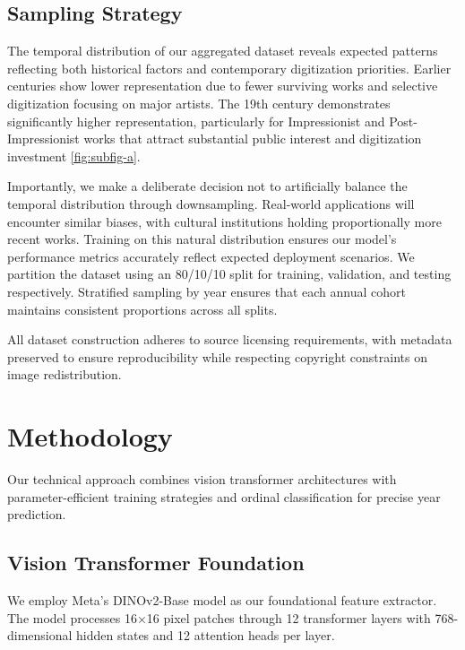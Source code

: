 \documentclass[10pt,twocolumn,letterpaper]{article}
\begin{document}
\subsection{Sampling Strategy}

The temporal distribution of our aggregated dataset reveals expected patterns reflecting both historical factors and contemporary digitization priorities. Earlier centuries show lower representation due to fewer surviving works and selective digitization focusing on major artists. The 19th century demonstrates significantly higher representation, particularly for Impressionist and Post-Impressionist works that attract substantial public interest and digitization investment \ref{fig:subfig-a}.

Importantly, we make a deliberate decision not to artificially balance the temporal distribution through downsampling. Real-world applications will encounter similar biases, with cultural institutions holding proportionally more recent works. Training on this natural distribution ensures our model's performance metrics accurately reflect expected deployment scenarios. We partition the dataset using an 80/10/10 split for training, validation, and testing respectively. Stratified sampling by year ensures that each annual cohort maintains consistent proportions across all splits.

All dataset construction adheres to source licensing requirements, with metadata preserved to ensure reproducibility while respecting copyright constraints on image redistribution.

\section{Methodology}

Our technical approach combines vision transformer architectures with parameter-efficient training strategies and ordinal classification for precise year prediction.

\subsection{Vision Transformer Foundation}

We employ Meta's DINOv2-Base model \cite{Oquab23} as our foundational feature extractor. The model processes 16×16 pixel patches through 12 transformer layers with 768-dimensional hidden states and 12 attention heads per layer.

\end{document}
